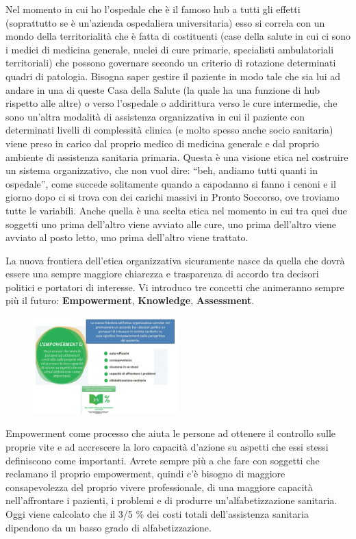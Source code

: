 Nel momento in cui ho l'ospedale che è il famoso hub a tutti gli effetti
(soprattutto se è un'azienda ospedaliera universitaria) esso si correla
con un mondo della territorialità che è fatta di costituenti (case della
salute in cui ci sono i medici di medicina generale, nuclei di cure
primarie, specialisti ambulatoriali territoriali) che possono governare
secondo un criterio di rotazione determinati quadri di patologia.
Bisogna saper gestire il paziente in modo tale che sia lui ad andare in
una di queste Casa della Salute (la quale ha una funzione di hub
rispetto alle altre) o verso l'ospedale o addirittura verso le cure
intermedie, che sono un'altra modalità di assistenza organizzativa in
cui il paziente con determinati livelli di complessità clinica (e molto
spesso anche socio sanitaria) viene preso in carico dal proprio medico
di medicina generale e dal proprio ambiente di assistenza sanitaria
primaria. Questa è una visione etica nel costruire un sistema
organizzativo, che non vuol dire: ``beh, andiamo tutti quanti in
ospedale'', come succede solitamente quando a capodanno si fanno i
cenoni e il giorno dopo ci si trova con dei carichi massivi in Pronto
Soccorso, ove troviamo tutte le variabili. Anche quella è una scelta
etica nel momento in cui tra quei due soggetti uno prima dell'altro
viene avviato alle cure, uno prima dell'altro viene avviato al posto
letto, uno prima dell'altro viene trattato.

La nuova frontiera dell'etica organizzativa sicuramente nasce da quella
che dovrà essere una sempre maggiore chiarezza e trasparenza di accordo
tra decisori politici e portatori di interesse. Vi introduco tre
concetti che animeranno sempre più il futuro: \textbf{Empowerment},
\textbf{Knowledge}, \textbf{Assessment}.

 \begin{figure}[!ht]
\centering
	\includegraphics[width=0.5\textwidth]{32/image12.jpeg}
	\end{figure}
	
Empowerment come processo che aiuta le persone ad ottenere il controllo
sulle proprie vite e ad accrescere la loro capacità d'azione su aspetti
che essi stessi definiscono come importanti. Avrete sempre più a che
fare con soggetti che reclamano il proprio empowerment, quindi c'è
bisogno di maggiore consapevolezza del proprio vivere professionale, di
una maggiore capacità nell'affrontare i pazienti, i problemi e di
produrre un'alfabetizzazione sanitaria. Oggi viene calcolato che il 3/5
\% dei costi totali dell'assistenza sanitaria dipendono da un basso
grado di alfabetizzazione.

